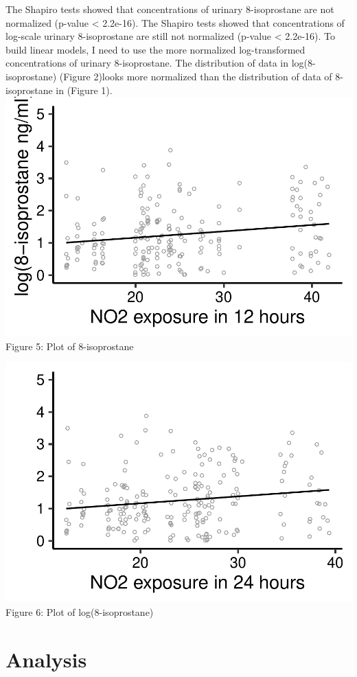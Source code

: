 \documentclass[12pt,]{article}
\begin{document}
The Shapiro tests showed that concentrations of urinary 8-isoprostane
are not normalized (p-value \textless{} 2.2e-16). The Shapiro tests
showed that concentrations of log-scale urinary 8-isoprostane are still
not normalized (p-value \textless{} 2.2e-16). To build linear models, I
need to use the more normalized log-transformed concentrations of
urinary 8-isoprostane. The distribution of data in log(8-isoprostane)
(Figure 2)looks more normalized than the distribution of data of
8-isoprostane in (Figure 1).
\includegraphics{trial_files/figure-latex/unnamed-chunk-6-1.pdf} Figure
5: Plot of 8-isoprostane

\includegraphics{trial_files/figure-latex/unnamed-chunk-7-1.pdf} Figure
6: Plot of log(8-isoprostane)

\hypertarget{analysis}{%
\section{Analysis}\label{analysis}}
\end{document}
